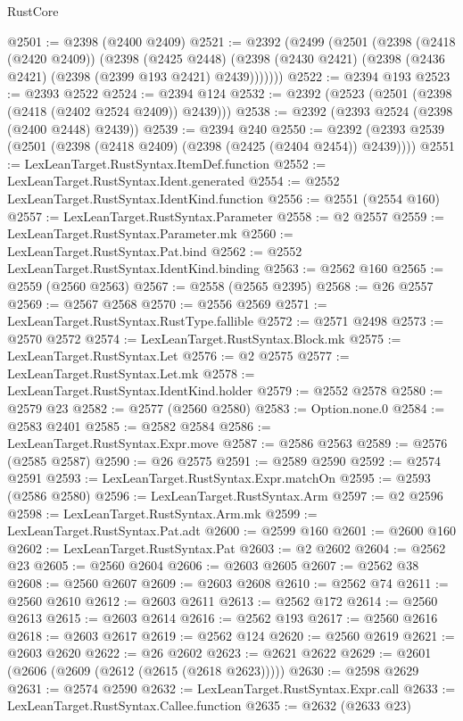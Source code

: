 \begin{lexlean}{RustCore}
\begin{coremodule}
@2501 := @2398 (@2400 @2409)
@2521 := @2392
    (@2499
      (@2501
        (@2398
          (@2418 (@2420 @2409))
          (@2398
            (@2425 @2448)
            (@2398 (@2430 @2421) (@2398 (@2436 @2421) (@2398 (@2399 @193 @2421) @2439)))))))
@2522 := @2394 @193
@2523 := @2393 @2522
@2524 := @2394 @124
@2532 := @2392 (@2523 (@2501 (@2398 (@2418 (@2402 @2524 @2409)) @2439)))
@2538 := @2392 (@2393 @2524 (@2398 (@2400 @2448) @2439))
@2539 := @2394 @240
@2550 := @2392 (@2393 @2539 (@2501 (@2398 (@2418 @2409) (@2398 (@2425 (@2404 @2454)) @2439))))
@2551 := LexLeanTarget.RustSyntax.ItemDef.function
@2552 := LexLeanTarget.RustSyntax.Ident.generated
@2554 := @2552 LexLeanTarget.RustSyntax.IdentKind.function
@2556 := @2551 (@2554 @160)
@2557 := LexLeanTarget.RustSyntax.Parameter
@2558 := @2 @2557
@2559 := LexLeanTarget.RustSyntax.Parameter.mk
@2560 := LexLeanTarget.RustSyntax.Pat.bind
@2562 := @2552 LexLeanTarget.RustSyntax.IdentKind.binding
@2563 := @2562 @160
@2565 := @2559 (@2560 @2563)
@2567 := @2558 (@2565 @2395)
@2568 := @26 @2557
@2569 := @2567 @2568
@2570 := @2556 @2569
@2571 := LexLeanTarget.RustSyntax.RustType.fallible
@2572 := @2571 @2498
@2573 := @2570 @2572
@2574 := LexLeanTarget.RustSyntax.Block.mk
@2575 := LexLeanTarget.RustSyntax.Let
@2576 := @2 @2575
@2577 := LexLeanTarget.RustSyntax.Let.mk
@2578 := LexLeanTarget.RustSyntax.IdentKind.holder
@2579 := @2552 @2578
@2580 := @2579 @23
@2582 := @2577 (@2560 @2580)
@2583 := Option.none.{0}
@2584 := @2583 @2401
@2585 := @2582 @2584
@2586 := LexLeanTarget.RustSyntax.Expr.move
@2587 := @2586 @2563
@2589 := @2576 (@2585 @2587)
@2590 := @26 @2575
@2591 := @2589 @2590
@2592 := @2574 @2591
@2593 := LexLeanTarget.RustSyntax.Expr.matchOn
@2595 := @2593 (@2586 @2580)
@2596 := LexLeanTarget.RustSyntax.Arm
@2597 := @2 @2596
@2598 := LexLeanTarget.RustSyntax.Arm.mk
@2599 := LexLeanTarget.RustSyntax.Pat.adt
@2600 := @2599 @160
@2601 := @2600 @160
@2602 := LexLeanTarget.RustSyntax.Pat
@2603 := @2 @2602
@2604 := @2562 @23
@2605 := @2560 @2604
@2606 := @2603 @2605
@2607 := @2562 @38
@2608 := @2560 @2607
@2609 := @2603 @2608
@2610 := @2562 @74
@2611 := @2560 @2610
@2612 := @2603 @2611
@2613 := @2562 @172
@2614 := @2560 @2613
@2615 := @2603 @2614
@2616 := @2562 @193
@2617 := @2560 @2616
@2618 := @2603 @2617
@2619 := @2562 @124
@2620 := @2560 @2619
@2621 := @2603 @2620
@2622 := @26 @2602
@2623 := @2621 @2622
@2629 := @2601 (@2606 (@2609 (@2612 (@2615 (@2618 @2623)))))
@2630 := @2598 @2629
@2631 := @2574 @2590
@2632 := LexLeanTarget.RustSyntax.Expr.call
@2633 := LexLeanTarget.RustSyntax.Callee.function
@2635 := @2632 (@2633 @23)

\end{coremodule}
\end{lexlean}
